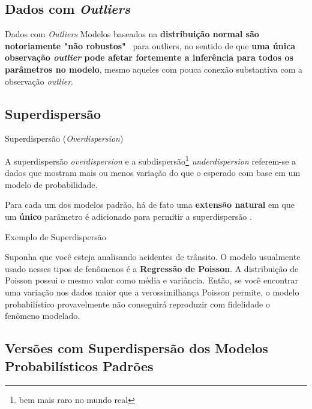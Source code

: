 \subsection{Dados com \textit{Outliers}}
\begin{frame}{Dados com \textit{Outliers}}
	Modelos baseados na \textbf{distribuição normal são notoriamente "não robustos"}~
	para outliers, no sentido de que \textbf{uma única observação \textit{outlier} pode
		afetar fortemente a inferência para todos os parâmetros no modelo},
	mesmo aqueles com pouca conexão substantiva com a observação \textit{outlier}.
\end{frame}

\subsection{Superdispersão}
\begin{frame}{Superdispersão (\textit{Overdispersion})}
	\begin{defn}
		A superdispersão \textit{overdispersion} e a subdispersão\footnote{bem
			mais raro no mundo real}
		\textit{underdispersion} referem-se a dados que mostram mais ou menos
		variação do que o esperado com base em um modelo de probabilidade.
		\parencite{gelman2020regression}
	\end{defn}
	\vfill
	Para cada um dos modelos padrão, há de fato uma \textbf{extensão natural} em que um
	\textbf{único} parâmetro é adicionado para permitir a superdispersão
	\parencite{gelman2013bayesian}.
\end{frame}

\begin{frame}{Exemplo de Superdispersão}
	\begin{exemplo}
		Suponha que você esteja analisando acidentes de trânsito.
		O modelo usualmente usado nesses tipos de fenômenos é a \textbf{Regressão
			de Poisson}.
		A distribuição de Poisson possui o mesmo valor como média e variância.
		Então, se você encontrar uma variação nos dados maior que a verossimilhança Poisson
		permite, o modelo probabilístico provavelmente não conseguirá reproduzir com
		fidelidade o fenômeno modelado.
	\end{exemplo}
\end{frame}

\subsection{Versões com Superdispersão dos Modelos Probabilísticos Padrões}
